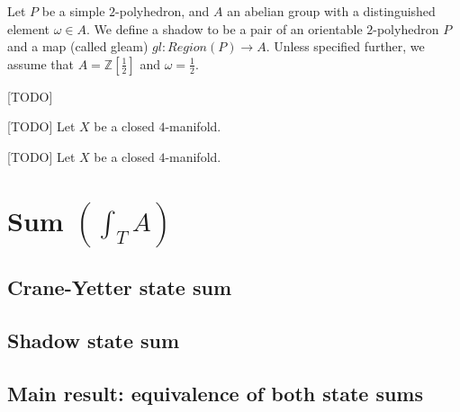 \begin{definition}[shadow]\label{def/shadow}
  Let $P$ be a simple $2$-polyhedron, and $A$ an abelian group
  with a distinguished element $\omega \in A$. We define a shadow
  to be a pair of an orientable $2$-polyhedron $P$ and a map
  (called gleam) $gl: Region(P) \to A$. Unless specified further,
  we assume that $A = \mathbb{Z}[\frac{1}{2}]$ and
  $\omega = \frac{1}{2}$.
\end{definition}

\begin{definition}\label{def/shadow-moves}
  [TODO]
\end{definition}

\begin{definition}\label{def/skeleton-of-a-4-manifold}
  [TODO]
  Let $X$ be a closed $4$-manifold.
\end{definition}

\begin{definition}\label{def/shadow-of-a-4-manifold}
  [TODO]
  Let $X$ be a closed $4$-manifold.
\end{definition}

\section{Sum $\left( \int_{T}{A} \right)$}
\subsection{Crane-Yetter state sum}
\subsection{Shadow state sum}
\subsection{Main result: equivalence of both state sums}
